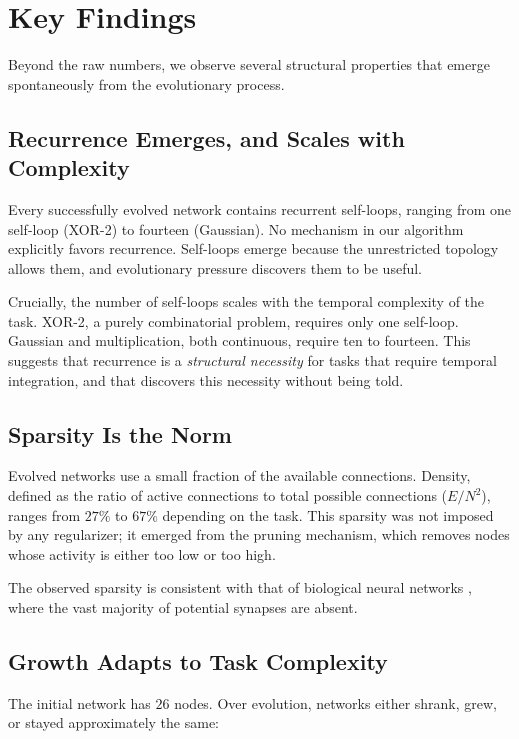 \section{Key Findings}

Beyond the raw numbers, we observe several structural properties that
emerge spontaneously from the evolutionary process.

\subsection{Recurrence Emerges, and Scales with Complexity}

Every successfully evolved network contains recurrent self-loops, ranging
from one self-loop (XOR-2) to fourteen (Gaussian). No mechanism in our
algorithm explicitly favors recurrence. Self-loops emerge because the
unrestricted topology allows them, and evolutionary pressure discovers them
to be useful.

Crucially, the number of self-loops scales with the temporal complexity of
the task. XOR-2, a purely combinatorial problem, requires only one
self-loop. Gaussian and multiplication, both continuous, require ten to
fourteen. This suggests that recurrence is a \emph{structural necessity}
for tasks that require temporal integration, and that \modnet{} discovers
this necessity without being told.

\subsection{Sparsity Is the Norm}

Evolved networks use a small fraction of the available connections. Density,
defined as the ratio of active connections to total possible connections
($E / N^2$), ranges from $27\%$ to $67\%$ depending on the task. This
sparsity was not imposed by any regularizer; it emerged from the pruning
mechanism, which removes nodes whose activity is either too low or too
high.

The observed sparsity is consistent with that of biological neural
networks \citep{chklovskii2004wiring}, where the vast majority of
potential synapses are absent.

\subsection{Growth Adapts to Task Complexity}

The initial network has $26$ nodes. Over evolution, networks either
shrank, grew, or stayed approximately the same:

